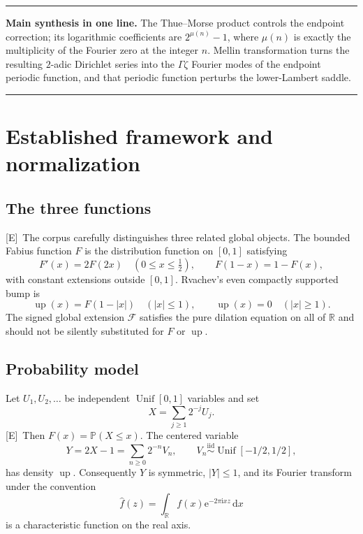 \documentclass[11pt,oneside]{article}
\theoremstyle{definition}
\theoremstyle{remark}
\newcommand{\R}{\mathbb R}
\newcommand{\Prob}{\mathbb P}
\newcommand{\Up}{\operatorname{up}}
\newcommand{\e}{\mathrm e}
\newcommand{\ii}{\mathrm i}
\newcommand{\dd}{\,\mathrm d}
\newcommand{\statusE}{\textsf{[E]}}
\newenvironment{boxedremark}{%
  \par\smallskip\noindent\begin{center}\begin{minipage}{0.94\textwidth}%
  \color{black}\hrule\vspace{0.6em}\small
}{%
  \vspace{0.6em}\hrule\end{minipage}\end{center}\smallskip
}
\begin{document}
\begin{boxedremark}
\textbf{Main synthesis in one line.}
The Thue--Morse product controls the endpoint correction; its logarithmic coefficients are
$2^{\mu(n)}-1$, where $\mu(n)$ is exactly the multiplicity of the Fourier zero at the integer
$n$.  Mellin transformation turns the resulting $2$-adic Dirichlet series into the
$\Gamma\zeta$ Fourier modes of the endpoint periodic function, and that periodic function
perturbs the lower-Lambert saddle.
\end{boxedremark}

\section{Established framework and normalization}

\subsection{The three functions}
\statusE\ The corpus carefully distinguishes three related global objects.
The bounded Fabius function $F$ is the distribution function on $[0,1]$ satisfying
\[
 F'(x)=2F(2x)\quad(0\le x\le\tfrac12),\qquad
 F(1-x)=1-F(x),
\]
with constant extensions outside $[0,1]$.  Rvachev's even compactly supported bump is
\[
 \Up(x)=F(1-|x|)\quad(|x|\le1),\qquad \Up(x)=0\quad(|x|\ge1).
\]
The signed global extension $\mathcal F$ satisfies the pure dilation equation on all of
$\R$ and should not be silently substituted for $F$ or $\Up$.

\subsection{Probability model}
Let $U_1,U_2,\ldots$ be independent $\operatorname{Unif}[0,1]$ variables and set
\begin{equation}
 X=\sum_{j\ge1}2^{-j}U_j.                                  \label{eq:X}
\end{equation}
\statusE\ Then $F(x)=\Prob(X\le x)$.  The centered variable
\begin{equation}
 Y=2X-1=\sum_{n\ge0}2^{-n}V_n,
 \qquad V_n\overset{\mathrm{iid}}\sim\operatorname{Unif}[-1/2,1/2], \label{eq:Y}
\end{equation}
has density $\Up$.  Consequently $Y$ is symmetric, $|Y|\le1$, and its Fourier transform
under the convention
\[
 \widehat f(z)=\int_\R f(x)\e^{-2\pi\ii xz}\dd x
\]
is a characteristic function on the real axis.
\end{document}
